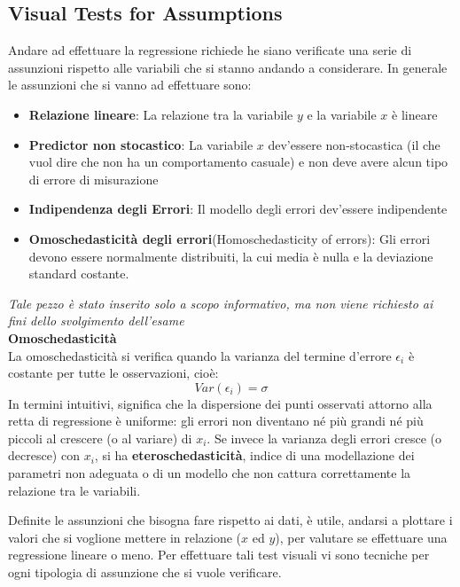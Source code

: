 \subsection{Visual Tests for Assumptions}
Andare ad effettuare la regressione richiede  he siano verificate una serie di assunzioni rispetto alle variabili che si stanno andando a considerare.
In generale le assunzioni che si vanno ad effettuare sono:
\begin{itemize}
    \item \textbf{Relazione lineare}: La relazione tra la variabile \(y\) e la variabile \(x\) è lineare
    \item \textbf{Predictor non stocastico}: La variabile \(x\) dev'essere non-stocastica (il che vuol dire che non ha un comportamento casuale) e non deve avere alcun tipo di errore di misurazione
    \item \textbf{Indipendenza degli Errori}: Il modello degli errori dev'essere indipendente
    \item \textbf{Omoschedasticità degli errori}(Homoschedasticity of errors): Gli errori devono essere normalmente distribuiti, la cui media è nulla e la deviazione standard costante.
\end{itemize}

\begin{info}
\textit{Tale pezzo è stato inserito solo a scopo informativo, ma non viene richiesto ai fini dello svolgimento dell'esame}
\\
\textbf{Omoschedasticità}
\\
La omoschedasticità si verifica quando la varianza del termine d’errore \(\epsilon_i\)
è costante per tutte le osservazioni, cioè:
\[
Var(\epsilon_i) = \sigma
\]
In termini intuitivi, significa che la dispersione dei punti osservati attorno alla retta di regressione è uniforme: gli errori non diventano né più grandi né più piccoli al crescere (o al variare) di \(x_i\).
Se invece la varianza degli errori cresce (o decresce) con \(x_i\), si ha \textbf{eteroschedasticità}, indice di una modellazione dei parametri non adeguata o di un modello che non cattura correttamente la relazione tra le variabili.
\end{info}

Definite le assunzioni che bisogna fare rispetto ai dati, è utile, andarsi a plottare i valori che si voglione mettere in relazione (\(x\) ed \(y\)), per valutare se effettuare una regressione lineare o meno.
Per effettuare tali test visuali vi sono tecniche per ogni tipologia di assunzione che si vuole verificare.

